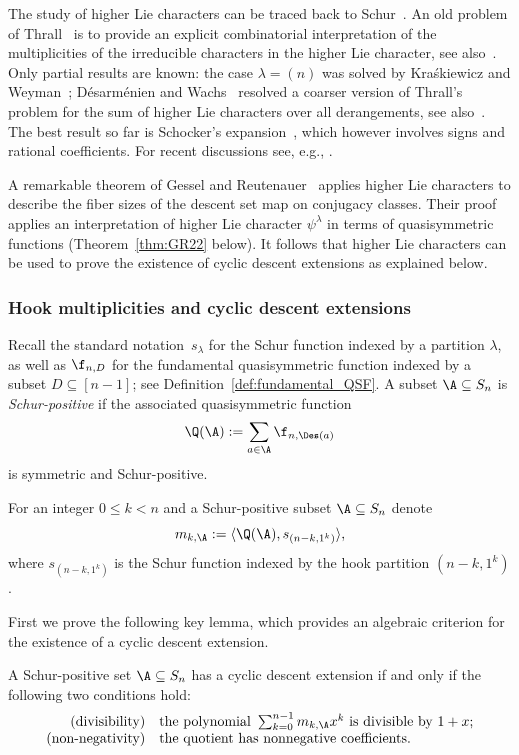 The study of higher Lie characters can be traced back 
to Schur~\cite{schur}. 
An old problem of Thrall~\cite{thrall} 
is to provide an explicit combinatorial interpretation of the 
multiplicities of the irreducible characters in the higher Lie character,
see also~\cite[Exercise~7.89(i)]{EC2}.
Only partial results are known: the case $\lambda = (n)$ was solved by Kra\'skiewicz and Weyman~\cite{KraskiewiczWeyman};
D\'esarm\'enien and Wachs~\cite{DesarmenienWachs} resolved a coarser version of Thrall's problem 
for the sum of higher Lie characters over all  
derangements, see also~\cite{ReinerWebb}. 
The best result so far is
Schocker's expansion~\cite[Theorem~3.1]{schocker}, which however involves signs and rational coefficients. 
For recent discussions see, e.g., \cite{Reiner, AS, Sundaram}.

A remarkable theorem of  Gessel and Reutenauer~\cite[Theorem 2.1]{GR} 
applies higher Lie characters to describe the fiber sizes of the descent set map on conjugacy classes.  
Their proof applies an interpretation of higher Lie character $\psi^\lambda$ in terms of quasisymmetric functions 
(Theorem~\ref{thm:GR22} below). 
It follows that 
higher Lie characters can be used to prove the existence of cyclic descent extensions 
as explained below. 


\subsubsection{Hook multiplicities and cyclic descent extensions} 

Recall the standard notation~$s_\lambda$ for the Schur function indexed by a partition $\lambda$, 
as well as $\f_{n,D}$ for the fundamental quasisymmetric function indexed by a subset $D\subseteq [n-1]$;
see Definition~\ref{def:fundamental_QSF}.
A subset $\A\subseteq S_n$ is {\em Schur-positive} 
if the
associated quasisymmetric function
\[
\Q(\A):=\sum\limits_{a\in \A}\f_{n,\Des(a)}
\]
is symmetric and Schur-positive.

For an integer $0 \le k<n$ and a Schur-positive subset $\A \subseteq S_n$ denote
\[
m_{k,\A} := \langle \Q(\A), s_{(n-k,1^k)} \rangle,
\]
where $s_{(n-k,1^k)}$ is the Schur function indexed by the hook partition $(n-k,1^k)$.

First we prove the following key lemma, which provides an algebraic criterion for the existence of a cyclic descent extension. 

\begin{lemma}\label{lem:21}
A Schur-positive set $\A\subseteq S_n$ has a cyclic descent extension if and only if 
the following two conditions hold:
\[
\begin{array}{rl}
	\text{\rm (divisibility)}   & 
	\text{the polynomial }
	\sum_{k=0}^{n-1} m_{k,\A} x^k
	\text{ is divisible by } 1+x; \\
	\text{\rm (non-negativity)} & 
	\text{the quotient has nonnegative coefficients.}
\end{array}
\]
\end{lemma}		

